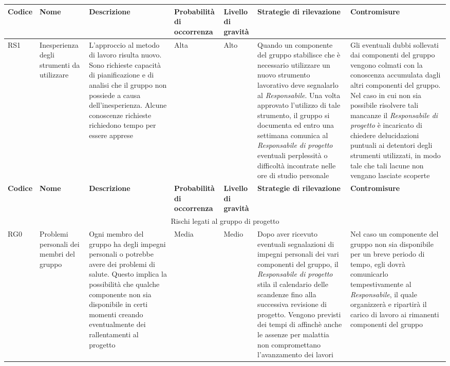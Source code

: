 \documentclass[../PianodiProgetto.tex]{subfiles}
\begin{document}
\begin{longtable}{|p{15mm}|p{23.5mm}|p{38mm}|p{22mm}|p{19mm}|p{30mm}|p{30mm}|}
	\newpage
	
		\hline \textbf{Codice} & \textbf{Nome} & \textbf{Descrizione} & \textbf{Probabilità di occorrenza} & \textbf{Livello di gravità} & \textbf{Strategie di rilevazione} & \textbf{Contromisure} \\
		
		\hline RS1 & Inesperienza degli strumenti da utilizzare &  L'approccio al metodo di lavoro risulta nuovo. Sono richieste capacità di pianificazione e di analisi che il gruppo non possiede a causa dell'inesperienza. Alcune conoscenze richieste richiedono tempo per essere apprese & Alta & Alto & Quando un componente del gruppo stabilisce che è necessario utilizzare un nuovo strumento lavorativo deve segnalarlo al  \textit{Responsabile}. Una volta approvato l'utilizzo di tale strumento, il gruppo si documenta ed entro una settimana comunica al \textit{Responsabile di progetto} eventuali perplessità o difficoltà incontrate nelle ore di studio personale & Gli eventuali dubbi sollevati dai componenti del gruppo vengono colmati con la conoscenza accumulata dagli altri componenti del gruppo. Nel caso in cui non sia possibile risolvere tali mancanze il \textit{Responsabile di progetto} è incaricato di chiedere delucidazioni puntuali ai detentori degli strumenti utilizzati, in modo tale che tali lacune non vengano lasciate scoperte \\
		
		\hline

		\newpage
	
		\hline \textbf{Codice} & \textbf{Nome} & \textbf{Descrizione} & \textbf{Probabilità di occorrenza} & \textbf{Livello di gravità} & \textbf{Strategie di rilevazione} & \textbf{Contromisure} \\
		
		\hline\multicolumn{7}{|c|}{Rischi legati al gruppo di progetto} \\
		
		\hline RG0 & Problemi personali dei membri del gruppo & Ogni membro del gruppo ha degli impegni personali o potrebbe avere dei problemi di salute. Questo implica la possibilità che qualche componente non sia disponibile in certi momenti creando eventualmente dei rallentamenti al progetto & Media & Medio & Dopo aver ricevuto eventuali segnalazioni di impegni personali dei vari componenti del gruppo, il \textit{Responsabile di progetto} stila il calendario delle scandenze fino alla successiva revisione di progetto. Vengono previsti dei tempi di \glossario{slack}{Slack} affinchè anche le assenze per malattia non compromettano l'avanzamento dei lavori & Nel caso un componente del gruppo non sia disponibile per un breve periodo di tempo, egli dovrà comunicarlo tempestivamente al \textit{Responsabile}, il quale organizzerà e ripartirà il carico di lavoro ai rimanenti componenti del gruppo \\ \hline


\end{longtable}
\end{document}

